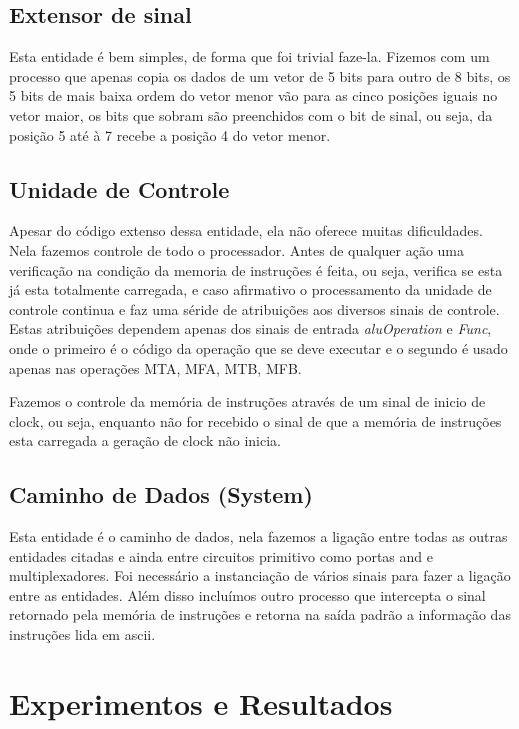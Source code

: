 \documentclass[12pt]{article}
\begin{document}
\subsection{Extensor de sinal}

Esta entidade é bem simples, de forma que foi trivial faze-la. Fizemos com um processo que apenas copia os dados de um vetor de 5 bits para outro de 8 bits, os 5 bits de mais baixa ordem do vetor menor vão para as cinco posições iguais no vetor maior, os bits que sobram são preenchidos com o bit de sinal, ou seja, da posição 5 até à 7 recebe a posição 4 do vetor menor.

\subsection{Unidade de Controle}

Apesar do código extenso dessa entidade, ela não oferece muitas dificuldades. Nela fazemos controle de todo o processador. Antes de qualquer ação uma verificação na condição da memoria de instruções é feita, ou seja, verifica se esta já esta totalmente carregada, e caso afirmativo o processamento da unidade de controle continua e faz uma séride de atribuições aos diversos sinais de controle. Estas atribuições dependem apenas dos sinais de entrada \textit{aluOperation} e \textit{Func}, onde o primeiro é o código da operação que se deve executar e o segundo é usado apenas nas operações MTA, MFA, MTB, MFB.

Fazemos o controle da memória de instruções através de um sinal de inicio de clock, ou seja, enquanto não for recebido o sinal de que a memória de instruções esta carregada a geração de clock não inicia.

\subsection{Caminho de Dados (System)}

Esta entidade é o caminho de dados, nela fazemos a ligação entre todas as outras entidades citadas e ainda entre circuitos primitivo como portas and e multiplexadores. Foi necessário a instanciação de vários sinais para fazer a ligação entre as entidades. Além disso incluímos outro processo que intercepta o sinal retornado pela memória de instruções e retorna na saída padrão a informação das instruções lida em ascii.

\section{Experimentos e Resultados}
\label{experimento}
\end{document}
